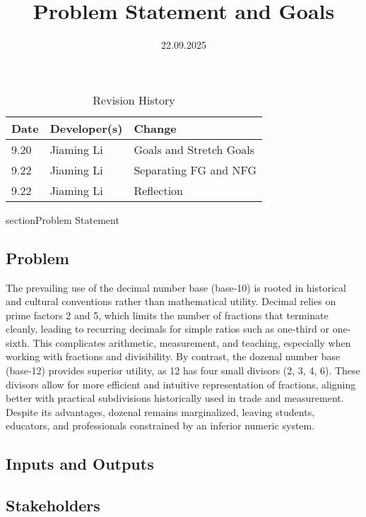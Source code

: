 \documentclass{article}
\title{Problem Statement and Goals\\\progname}
\author{\authname}{Ammar Sharbat & Jiaming Li}
\date{22.09.2025}
\begin{document}
    \maketitle

    \begin{table}[hp]
        \caption{Revision History} \label{TblRevisionHistory}
        \begin{tabularx}{\textwidth}{llX}
            \toprule
            \textbf{Date} & \textbf{Developer(s)} & \textbf{Change}\\
            \midrule
            9.20 & Jiaming Li & Goals and Stretch Goals\\
            9.22 & Jiaming Li & Separating FG and NFG\\
            9.22 & Jiaming Li & Reflection\\
            \bottomrule
        \end{tabularx}
    \end{table}

    section{Problem Statement}

    \subsection{Problem}
    The prevailing use of the decimal number base (base-10) is rooted in historical 
    and cultural conventions rather than mathematical utility. Decimal relies on prime 
    factors 2 and 5, which limits the number of fractions that terminate cleanly, 
    leading to recurring decimals for simple ratios such as one-third or one-sixth. 
    This complicates arithmetic, measurement, and teaching, especially when working 
    with fractions and divisibility. By contrast, the dozenal number base (base-12) 
    provides superior utility, as 12 has four small divisors (2, 3, 4, 6). These 
    divisors allow for more efficient and intuitive representation of fractions, 
    aligning better with practical subdivisions historically used in trade and 
    measurement. Despite its advantages, dozenal remains marginalized, leaving 
    students, educators, and professionals constrained by an inferior numeric system.

    \subsection{Inputs and Outputs}


    \subsection{Stakeholders}
\end{document}
